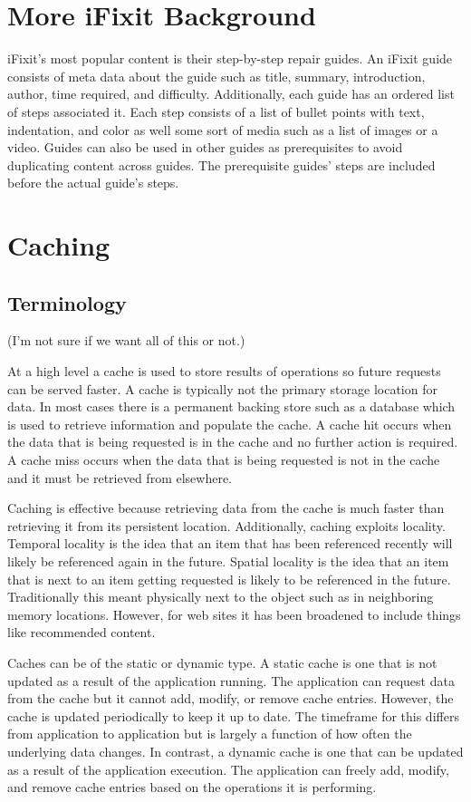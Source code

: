 \documentclass[12pt]{ucthesis}
\begin{document}
\section{More iFixit Background}
iFixit's most popular content is their step-by-step repair guides.
An iFixit guide consists of meta data about the guide such as title, summary, introduction, author, time required, and difficulty.
Additionally, each guide has an ordered list of steps associated it.
Each step consists of a list of bullet points with text, indentation, and color as well some sort of media such as a list of images or a video.
Guides can also be used in other guides as prerequisites to avoid duplicating content across guides.
The prerequisite guides' steps are included before the actual guide's steps.

\section{Caching}

\subsection{Terminology}
(I'm not sure if we want all of this or not.)

At a high level a cache is used to store results of operations so future requests can be served faster.
A cache is typically not the primary storage location for data.
In most cases there is a permanent backing store such as a database which is used to retrieve information and populate the cache.
A cache hit occurs when the data that is being requested is in the cache and no further action is required.
A cache miss occurs when the data that is being requested is not in the cache and it must be retrieved from elsewhere.

Caching is effective because retrieving data from the cache is much faster than retrieving it from its persistent location.
Additionally, caching exploits locality.
Temporal locality is the idea that an item that has been referenced recently will likely be referenced again in the future.
Spatial locality is the idea that an item that is next to an item getting requested is likely to be referenced in the future.
Traditionally this meant physically next to the object such as in neighboring memory locations.
However, for web sites it has been broadened to include things like recommended content.

Caches can be of the static or dynamic type.
A static cache is one that is not updated as a result of the application running.
The application can request data from the cache but it cannot add, modify, or remove cache entries.
However, the cache is updated periodically to keep it up to date.
The timeframe for this differs from application to application but is largely a function of how often the underlying data changes.
In contrast, a dynamic cache is one that can be updated as a result of the application execution.
The application can freely add, modify, and remove cache entries based on the operations it is performing.
\end{document}
